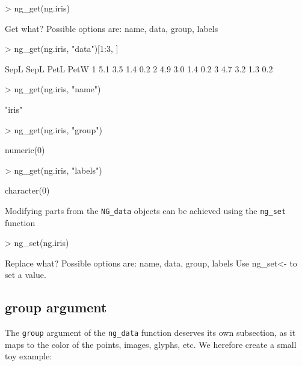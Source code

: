 \documentclass[12pt,oneside,titlepage,letter]{article}
\begin{document}
\begin{Schunk}
\begin{Sinput}
> ng_get(ng.iris)
\end{Sinput}
\begin{Soutput}
Get what? Possible options are: name, data, group, labels
\end{Soutput}
\begin{Sinput}
> ng_get(ng.iris, "data")[1:3, ]
\end{Sinput}
\begin{Soutput}
  SepL SepL PetL PetW
1  5.1  3.5  1.4  0.2
2  4.9  3.0  1.4  0.2
3  4.7  3.2  1.3  0.2
\end{Soutput}
\begin{Sinput}
> ng_get(ng.iris, "name")
\end{Sinput}
\begin{Soutput}
[1] "iris"
\end{Soutput}
\begin{Sinput}
> ng_get(ng.iris, "group")
\end{Sinput}
\begin{Soutput}
numeric(0)
\end{Soutput}
\begin{Sinput}
> ng_get(ng.iris, "labels")
\end{Sinput}
\begin{Soutput}
character(0)
\end{Soutput}
\end{Schunk}

Modifying parts from the \texttt{NG\_data} objects can be achieved using the \texttt{ng\_set} function

\begin{Schunk}
\begin{Sinput}
> ng_set(ng.iris)
\end{Sinput}
\begin{Soutput}
Replace what? Possible options are: name, data, group, labels 
Use ng_set<- to set a value.
\end{Soutput}
\end{Schunk}


\subsection{group argument}
The \texttt{group} argument of the \texttt{ng\_data} function deserves its own subsection, as it maps to the color of the points, images, glyphs, etc. We herefore create a small toy example:
\end{document}
